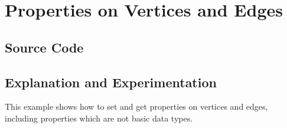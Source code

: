 \documentclass{report}
\begin{document}
% 
% 


\pagebreak
\section{Properties on Vertices and Edges}

\subsection{Source Code}



\subsection{Explanation and Experimentation}

This example shows how to set and get properties on vertices and edges,
including properties which are not basic data types.
\end{document}

